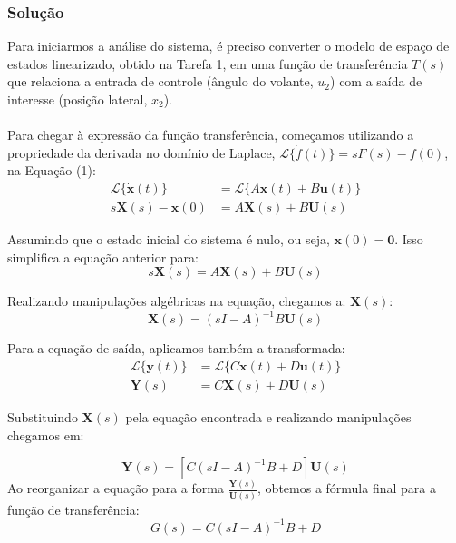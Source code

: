 \documentclass[a4paper,11pt]{article}
\begin{document}
\subsubsection*{\sc Solução}

Para iniciarmos a análise do sistema, é preciso converter o modelo de espaço de estados linearizado, obtido na Tarefa 1, em uma função de transferência $T(s)$ que relaciona a entrada de controle (ângulo do volante, $u_2$) com a saída de interesse (posição lateral, $x_2$).
\\\\
Para chegar à expressão da função transferência, começamos utilizando a propriedade da derivada no domínio de Laplace, $\mathcal{L}\{\dot{f}(t)\} = sF(s) - f(0)$, na Equação (1):
\begin{align*}
    \mathcal{L}\{\dot{\mathbf{x}}(t)\} &= \mathcal{L}\{A\mathbf{x}(t) + B\mathbf{u}(t)\} \\
    s\mathbf{X}(s) - \mathbf{x}(0) &= A\mathbf{X}(s) + B\mathbf{U}(s)
\end{align*}

Assumindo que o estado inicial do sistema é nulo, ou seja, $\mathbf{x}(0) = \mathbf{0}$. Isso simplifica a equação anterior para:
\begin{equation*}
    s\mathbf{X}(s) = A\mathbf{X}(s) + B\mathbf{U}(s)
\end{equation*}

Realizando manipulações algébricas na equação, chegamos a:
$\mathbf{X}(s)$:
\begin{equation*}
    \mathbf{X}(s) = (sI - A)^{-1}B\mathbf{U}(s)
\end{equation*}

Para a equação de saída, aplicamos também a transformada:
\begin{align*}
    \mathcal{L}\{\mathbf{y}(t)\} &= \mathcal{L}\{C\mathbf{x}(t) + D\mathbf{u}(t)\} \\
    \mathbf{Y}(s) &= C\mathbf{X}(s) + D\mathbf{U}(s)
\end{align*}

Substituindo $\mathbf{X}(s)$ pela equação encontrada e realizando manipulações chegamos em:

\begin{equation*}
    \mathbf{Y}(s) = \left[ C(sI - A)^{-1}B + D \right] \mathbf{U}(s)
\end{equation*}
Ao reorganizar a equação para a forma $\frac{\mathbf{Y}(s)}{\mathbf{U}(s)}$, obtemos a fórmula final para a função de transferência:
\begin{equation*}
    \boxed{G(s) = C(sI - A)^{-1}B + D}
\end{equation*}
\end{document}

